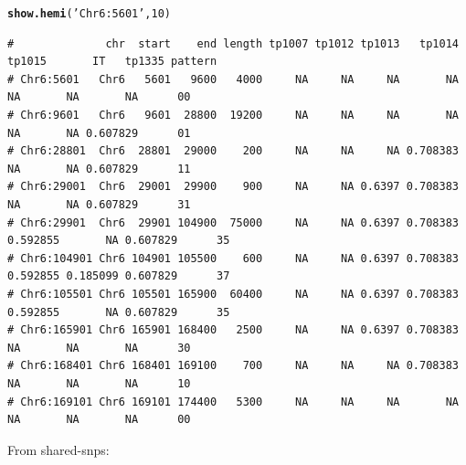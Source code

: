 \documentclass{article}\usepackage[]{graphicx}\usepackage[]{color}
\makeatletter
\newcommand{\hlnum}[1]{\textcolor[rgb]{0.686,0.059,0.569}{#1}}%
\newcommand{\hlstr}[1]{\textcolor[rgb]{0.192,0.494,0.8}{#1}}%
\newcommand{\hlstd}[1]{\textcolor[rgb]{0.345,0.345,0.345}{#1}}%
\newcommand{\hlkwd}[1]{\textcolor[rgb]{0.737,0.353,0.396}{\textbf{#1}}}%
\newenvironment{kframe}{%
 \def\at@end@of@kframe{}%
 \ifinner\ifhmode%
  \def\at@end@of@kframe{\end{minipage}}%
  \begin{minipage}{\columnwidth}%
 \fi\fi%
 \def\FrameCommand##1{\hskip\@totalleftmargin \hskip-\fboxsep
 \colorbox{shadecolor}{##1}\hskip-\fboxsep
     \hskip-\linewidth \hskip-\@totalleftmargin \hskip\columnwidth}%
 \MakeFramed {\advance\hsize-\width
   \@totalleftmargin\z@ \linewidth\hsize
   \@setminipage}}%
 {\par\unskip\endMakeFramed%
 \at@end@of@kframe}
\newenvironment{knitrout}{}{} %
\makeatother
\begin{document}
\begin{knitrout}\scriptsize
{}\color{fgcolor}\begin{kframe}
\begin{alltt}
\hlkwd{show.hemi}\hlstd{(}\hlstr{'Chr6:5601'}\hlstd{,}\hlnum{10}\hlstd{)}
\end{alltt}
\begin{verbatim}
#              chr  start    end length tp1007 tp1012 tp1013   tp1014   tp1015       IT   tp1335 pattern
# Chr6:5601   Chr6   5601   9600   4000     NA     NA     NA       NA       NA       NA       NA      00
# Chr6:9601   Chr6   9601  28800  19200     NA     NA     NA       NA       NA       NA 0.607829      01
# Chr6:28801  Chr6  28801  29000    200     NA     NA     NA 0.708383       NA       NA 0.607829      11
# Chr6:29001  Chr6  29001  29900    900     NA     NA 0.6397 0.708383       NA       NA 0.607829      31
# Chr6:29901  Chr6  29901 104900  75000     NA     NA 0.6397 0.708383 0.592855       NA 0.607829      35
# Chr6:104901 Chr6 104901 105500    600     NA     NA 0.6397 0.708383 0.592855 0.185099 0.607829      37
# Chr6:105501 Chr6 105501 165900  60400     NA     NA 0.6397 0.708383 0.592855       NA 0.607829      35
# Chr6:165901 Chr6 165901 168400   2500     NA     NA 0.6397 0.708383       NA       NA       NA      30
# Chr6:168401 Chr6 168401 169100    700     NA     NA     NA 0.708383       NA       NA       NA      10
# Chr6:169101 Chr6 169101 174400   5300     NA     NA     NA       NA       NA       NA       NA      00
\end{verbatim}
\end{kframe}
\end{knitrout}

From shared-snps:
\end{document}
